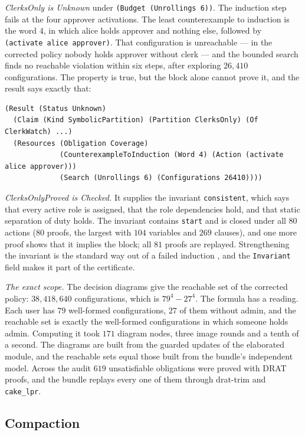 \documentclass[11pt]{article}
\newcommand{\code}[1]{\texttt{#1}}
\theoremstyle{definition}
\theoremstyle{plain}
\begin{document}
\emph{ClerksOnly is Unknown} under \code{(Budget (Unrollings 6))}. The induction step fails at the
four approver activations. The least counterexample to induction is the word $4$, in which alice
holds approver and nothing else, followed by \code{(activate alice approver)}. That configuration is
unreachable --- in the corrected policy nobody holds approver without clerk --- and the bounded search
finds no reachable violation within six steps, after exploring $26{,}410$ configurations. The
property is true, but the block alone cannot prove it, and the result says exactly that:
\begin{lstlisting}
(Result (Status Unknown)
  (Claim (Kind SymbolicPartition) (Partition ClerksOnly) (Of ClerkWatch) ...)
  (Resources (Obligation Coverage)
             (CounterexampleToInduction (Word 4) (Action (activate alice approver)))
             (Search (Unrollings 6) (Configurations 26410))))
\end{lstlisting}

\emph{ClerksOnlyProved is Checked.} It supplies the invariant \code{consistent}, which says that
every active role is assigned, that the role dependencies hold, and that static separation of duty
holds. The invariant contains \code{start} and is closed under all $80$ actions ($80$ proofs, the
largest with $104$ variables and $269$ clauses), and one more proof shows that it implies the block;
all $81$ proofs are replayed.
Strengthening the invariant is the standard way out of a failed induction \cite{ic3}, and the
\code{Invariant} field makes it part of the certificate.

\emph{The exact scope.} The decision diagrams give the reachable set of the corrected policy:
$38{,}418{,}640$ configurations, which is $79^4-27^4$. The formula has a reading. Each user has $79$
well-formed configurations, $27$ of them without admin, and the reachable set is exactly the
well-formed configurations in which someone holds admin. Computing it took $171$ diagram nodes,
three image rounds and a tenth of a second. The diagrams are built from the guarded updates of the
elaborated module, and the reachable sets equal those built from the bundle's independent model.
Across the audit $619$ unsatisfiable obligations were proved with DRAT proofs, and the bundle
replays every one of them through drat-trim and \code{cake\_lpr}.

\subsection{Compaction}
\end{document}
